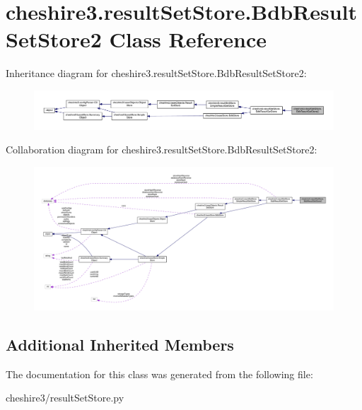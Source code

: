 \hypertarget{classcheshire3_1_1result_set_store_1_1_bdb_result_set_store2}{\section{cheshire3.\-result\-Set\-Store.\-Bdb\-Result\-Set\-Store2 Class Reference}
\label{classcheshire3_1_1result_set_store_1_1_bdb_result_set_store2}
}


Inheritance diagram for cheshire3.\-result\-Set\-Store.\-Bdb\-Result\-Set\-Store2\-:
\nopagebreak
\begin{figure}[H]
\begin{center}
\leavevmode
\includegraphics[width=350pt]{classcheshire3_1_1result_set_store_1_1_bdb_result_set_store2__inherit__graph}
\end{center}
\end{figure}


Collaboration diagram for cheshire3.\-result\-Set\-Store.\-Bdb\-Result\-Set\-Store2\-:
\nopagebreak
\begin{figure}[H]
\begin{center}
\leavevmode
\includegraphics[width=350pt]{classcheshire3_1_1result_set_store_1_1_bdb_result_set_store2__coll__graph}
\end{center}
\end{figure}
\subsection*{Additional Inherited Members}


The documentation for this class was generated from the following file\-:\begin{DoxyCompactItemize}
\item 
cheshire3/result\-Set\-Store.\-py\end{DoxyCompactItemize}
